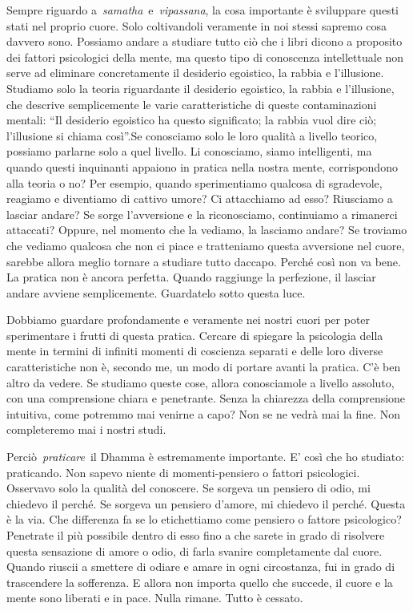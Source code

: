 Sempre riguardo a~\emph{samatha}~e~\emph{vipassana}, la cosa importante
è sviluppare questi stati nel proprio cuore. Solo coltivandoli veramente
in noi stessi sapremo cosa davvero sono. Possiamo andare a studiare
tutto ciò che i libri dicono a proposito dei fattori psicologici della
mente, ma questo tipo di conoscenza intellettuale non serve ad eliminare
concretamente il desiderio egoistico, la rabbia e l'illusione. Studiamo
solo la teoria riguardante il desiderio egoistico, la rabbia e
l'illusione, che descrive semplicemente le varie caratteristiche di
queste contaminazioni mentali: ``Il desiderio egoistico ha questo
significato; la rabbia vuol dire ciò; l'illusione si chiama così''.Se
conosciamo solo le loro qualità a livello teorico, possiamo parlarne
solo a quel livello. Li conosciamo, siamo intelligenti, ma quando questi
inquinanti appaiono in pratica nella nostra mente, corrispondono alla
teoria o no? Per esempio, quando sperimentiamo qualcosa di sgradevole,
reagiamo e diventiamo di cattivo umore? Ci attacchiamo ad esso?
Riusciamo a lasciar andare? Se sorge l'avversione e la riconosciamo,
continuiamo a rimanerci attaccati? Oppure, nel momento che la vediamo,
la lasciamo andare? Se troviamo che vediamo qualcosa che non ci piace e
tratteniamo questa avversione nel cuore, sarebbe allora meglio tornare a
studiare tutto daccapo. Perché così non va bene. La pratica non è ancora
perfetta. Quando raggiunge la perfezione, il lasciar andare avviene
semplicemente. Guardatelo sotto questa luce.

Dobbiamo guardare profondamente e veramente nei nostri cuori per poter
sperimentare i frutti di questa pratica. Cercare di spiegare la
psicologia della mente in termini di infiniti momenti di coscienza
separati e delle loro diverse caratteristiche non è, secondo me, un modo
di portare avanti la pratica. C'è ben altro da vedere. Se studiamo
queste cose, allora conosciamole a livello assoluto, con una
comprensione chiara e penetrante. Senza la chiarezza della comprensione
intuitiva, come potremmo mai venirne a capo? Non se ne vedrà mai la
fine. Non completeremo mai i nostri studi.

Perciò~\emph{praticare}~il Dhamma è estremamente importante. E' così che
ho studiato: praticando. Non sapevo niente di momenti-pensiero o fattori
psicologici. Osservavo solo la qualità del conoscere. Se sorgeva un
pensiero di odio, mi chiedevo il perché. Se sorgeva un pensiero d'amore,
mi chiedevo il perché. Questa è la via. Che differenza fa se lo
etichettiamo come pensiero o fattore psicologico? Penetrate il più
possibile dentro di esso fino a che sarete in grado di risolvere questa
sensazione di amore o odio, di farla svanire completamente dal cuore.
Quando riuscii a smettere di odiare e amare in ogni circostanza, fui in
grado di trascendere la sofferenza. E allora non importa quello che
succede, il cuore e la mente sono liberati e in pace. Nulla rimane.
Tutto è cessato.

